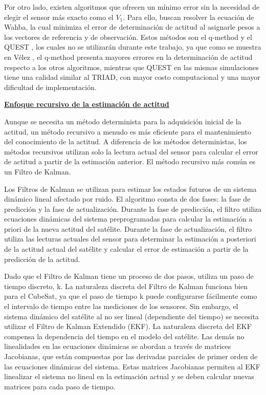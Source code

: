 Por otro lado, existen algoritmos que ofrecen un mínimo error sin la necesidad de elegir el sensor más exacto como el $V_1$. Para ello, buscan resolver la ecuación de Wahba, la cual minimiza el error de determinación de actitud al asignarle pesos a los vectores de referencia y de observación. Estos métodos son el q-method y el QUEST \cite{ref15}, los cuales no se utilizarán durante este trabajo, ya que como se muestra en Vélez \cite{ref15}, el q-method presenta mayores errores en la determinación de actitud respecto a los otros algoritmos, mientras que QUEST en las mismas simulaciones tiene una calidad similar al TRIAD, con mayor costo computacional y una mayor dificultad de implementación.

\textbf{\underline{Enfoque recursivo de la estimación de actitud}}

Aunque se necesita un método determinista para la adquisición inicial de la actitud, un método recursivo a menudo es más eficiente para el mantenimiento del conocimiento de la actitud. A diferencia de los métodos deterministas, los métodos recursivos utilizan solo la lectura actual del sensor para calcular el error de actitud a partir de la estimación anterior. El método recursivo más común es un Filtro de Kalman.

Los Filtros de Kalman se utilizan para estimar los estados futuros de un sistema dinámico lineal afectado por ruido. El algoritmo consta de dos fases: la fase de predicción y la fase de actualización. Durante la fase de predicción, el filtro utiliza ecuaciones dinámicas del sistema preprogramadas para calcular la estimación a priori de la nueva actitud del satélite. Durante la fase de actualización, el filtro utiliza las lecturas actuales del sensor para determinar la estimación a posteriori de la actitud actual del satélite y calcular el error de estimación a partir de la predicción de la actitud.

Dado que el Filtro de Kalman tiene un proceso de dos pasos, utiliza un paso de tiempo discreto, k. La naturaleza discreta del Filtro de Kalman funciona bien para el CubeSat, ya que el paso de tiempo k puede configurarse fácilmente como el intervalo de tiempo entre las mediciones de los sensores. Sin embargo, el sistema dinámico del satélite al no ser lineal (dependiente del tiempo) se necesita utilizar el Filtro de Kalman Extendido (EKF). La naturaleza discreta del EKF compensa la dependencia del tiempo en el modelo del satélite. Las demás no linealidades en las ecuaciones dinámicas se abordan a través de matrices Jacobianas, que están compuestas por las derivadas parciales de primer orden de las ecuaciones dinámicas del sistema. Estas matrices Jacobianas permiten al EKF linealizar el sistema no lineal en la estimación actual y se deben calcular nuevas matrices para cada paso de tiempo.

